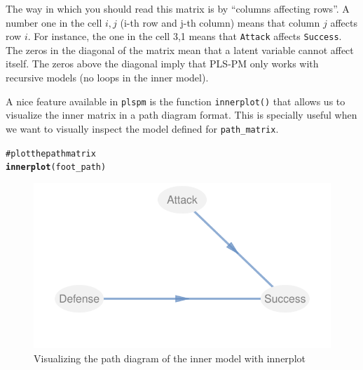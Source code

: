 \documentclass[12pt]{book}\usepackage{graphicx, color}
\makeatletter
\newcommand{\hlfunctioncall}[1]{\textcolor[rgb]{0.501960784313725,0,0.329411764705882}{\textbf{#1}}}%
\newcommand{\hlcomment}[1]{\textcolor[rgb]{0.180392156862745,0.6,0.341176470588235}{#1}}%
\newenvironment{kframe}{%
 \def\at@end@of@kframe{}%
 \ifinner\ifhmode%
  \def\at@end@of@kframe{\end{minipage}}%
  \begin{minipage}{\columnwidth}%
 \fi\fi%
 \def\FrameCommand##1{\hskip\@totalleftmargin \hskip-\fboxsep
 \colorbox{shadecolor}{##1}\hskip-\fboxsep
     \hskip-\linewidth \hskip-\@totalleftmargin \hskip\columnwidth}%
 \MakeFramed {\advance\hsize-\width
   \@totalleftmargin\z@ \linewidth\hsize
   \@setminipage}}%
 {\par\unskip\endMakeFramed%
 \at@end@of@kframe}
\newenvironment{knitrout}{}{} %
\newcommand{\plspm}{\texttt{plspm}}
\newcommand{\code}[1]{\texttt{#1}}
\makeatother
\begin{document}
The way in which you should read this matrix is by ``columns affecting rows''. A number one in the cell $i,j$ (i-th row and j-th column) means that column $j$ affects row $i$. For instance, the one in the cell 3,1 means that \texttt{Attack} affects \texttt{Success}. The zeros in the diagonal of the matrix mean that a latent variable cannot affect itself. The zeros above the diagonal imply that PLS-PM only works with recursive models (no loops in the inner model).

A nice feature available in \plspm{} is the function \code{innerplot()} that allows us to visualize the inner matrix in a path diagram format. This is specially useful when we want to visually inspect the model defined for \code{path\_matrix}.
\begin{knitrout}
\color{fgcolor}\begin{kframe}
\begin{alltt}
\hlcomment{# plot the path matrix}
\hlfunctioncall{innerplot}(foot_path)
\end{alltt}
\end{kframe}\begin{figure}[h]


{\centering \includegraphics[width=.65\linewidth,height=.4\linewidth]{figure/innerplot_spainfoot} 

}

\caption[Visualizing the path diagram of the inner model with innerplot]{Visualizing the path diagram of the inner model with innerplot\label{fig:innerplot_spainfoot}}
\end{figure}


\end{knitrout}
\end{document}
